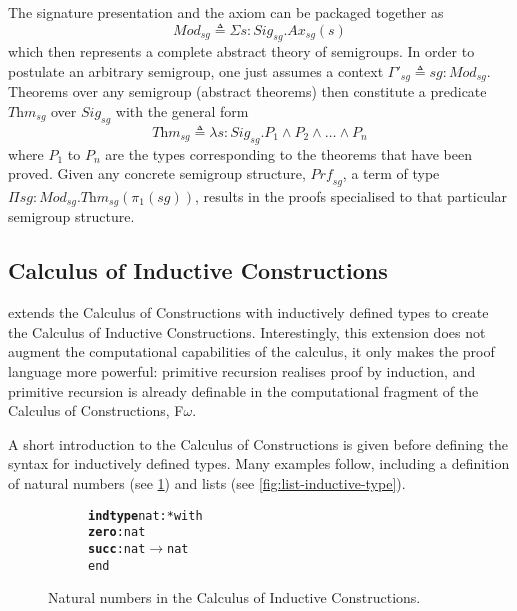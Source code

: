 \documentclass[12pt,toc=bibliography,numbers=noendperiod,
               footnotes=multiple,twoside]{scrartcl}
\begin{document}
The signature presentation and the axiom can be packaged together as \[\textit{Mod}_{sg} \triangleq \Sigma s : \textit{Sig}_{sg}. \textit{Ax}_{sg}(s)\] which then represents a complete abstract theory of semigroups. In order to postulate an arbitrary semigroup, one just assumes a context \(\Gamma'_{sg} \triangleq sg : \textit{Mod}_{sg}\). Theorems over any semigroup (abstract theorems) then constitute a predicate \(\textit{Thm}_{sg}\) over \(\textit{Sig}_{sg}\) with the general form \[\textit{Thm}_{sg} \triangleq \lambda s : \textit{Sig}_{sg}. P_1 \wedge P_2 \wedge \dots \wedge P_n\] where \(P_1\) to \(P_n\) are the types corresponding to the theorems that have been proved. Given any concrete semigroup structure, \(\textit{Prf}_{sg}\), a term of type \(\Pi sg : \textit{Mod}_{sg}. \textit{Thm}_{sg}(\pi_1(sg))\), results in the proofs specialised to that particular semigroup structure.

\subsection{Calculus of Inductive Constructions}

\textcite{pfenning_inductively_1990} extends the Calculus of Constructions with inductively defined types to create the Calculus of Inductive Constructions. Interestingly, this extension does not augment the computational capabilities of the calculus, it only makes the proof language more powerful: primitive recursion realises proof by induction, and primitive recursion is already definable in the computational fragment of the Calculus of Constructions, F\(\omega\).

A short introduction to the Calculus of Constructions is given before defining the syntax for inductively defined types. Many examples follow, including a definition of natural numbers (see \cref{fig:nat-inductive-type}) and lists (see \cref{fig:list-inductive-type}).

\begin{figure}[h]
\centering
\begin{subfigure}[t]{0.3\linewidth}
\begin{alltt}
\textbf{indtype} nat : * with
    \textbf{zero} : nat
    \textbf{succ} : nat \(\rightarrow\) nat
end
\end{alltt}
\end{subfigure}
\caption{Natural numbers in the Calculus of Inductive Constructions.}
\label{fig:nat-inductive-type}
\end{figure}
\end{document}
